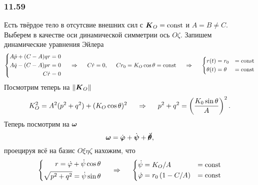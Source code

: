 \subsubsection*{11.59}

Есть твёрдое тело в отсутсвие внешних сил с $\mbox{\boldmath $K$}_O = \text{const}$ и $A = B \neq C$. Выберем в качестве оси динамической симметрии ось $O\zeta$. Запишем динамические уравнения Эйлера
\begin{equation*}
    \left\{\begin{aligned}
        A \dot{p} + (C-A) qr &= 0 \\
        A \dot{q} - (C-A) pr &= 0 \\
        C \dot{r} &= 0
    \end{aligned}\right.
    \hspace{0.5cm} \Rightarrow \hspace{0.5cm} 
    C \dot{r} = 0, \hspace{0.5cm} Cr_0 = K_O \cos \theta = \text{const}
    \hspace{0.5cm} \Rightarrow \hspace{0.5cm} 
    \left\{\begin{aligned}
        r(t) &= r_0 &= \text{const}\\
        \theta(t) &= \theta &= \text{const}
    \end{aligned}\right.
\end{equation*}
Посмотрим теперь на $\|\mbox{\boldmath $K$}_O\|$
\begin{equation*}
    K_O^2 = A^2 (p^2 + q^2) + (K_O \cos \theta)^2
    \hspace{0.5cm} \Rightarrow \hspace{0.5cm} 
    p^2 + q^2 = \left(\frac{K_0 \sin \theta}{A} \right)^2.
\end{equation*}
Теперь посмотрим на $\mbox{\boldmath $\omega$}$
\begin{equation*}
    \mbox{\boldmath $\omega$} = \dot{\mbox{\boldmath $\varphi$}} + \dot{\mbox{\boldmath $\psi$}} + \cancel{\dot{\mbox{\boldmath $\theta$}}},
\end{equation*}
проецируя всё на базис $O\xi\eta\zeta$ нахожим, что
\begin{equation*}
    \left\{\begin{aligned}
        r = \dot{\varphi} + \dot{\psi} \cos \theta \\
        \sqrt{p^2 + q^2} = \dot{\psi} \sin \theta       
    \end{aligned}\right.
    \hspace{0.5cm} \Rightarrow \hspace{0.5cm} 
   \left\{\begin{aligned}
       \dot{\psi} &= {K_O}/{A} &= \text{const} \\
       \dot{\varphi} &= r_0 \left(1 - {C}/{A} \right) &=\text{const}
   \end{aligned}\right.
\end{equation*}
